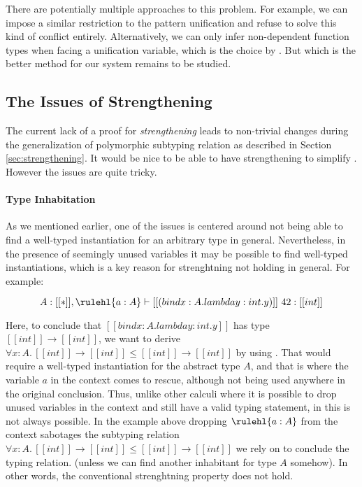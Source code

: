 There are potentially multiple approaches to this problem. For example, we can
impose a similar restriction to the pattern unification and refuse to solve
this kind of conflict entirely. Alternatively, we can only infer non-dependent function types when
facing a unification variable, which is the choice by \citet{dh}. But which is
the better method for our system remains to be studied.

\subsection{The Issues of Strengthening}
\label{sec:habitability}

The current lack of a proof for \emph{strengthening} leads to non-trivial
changes during the generalization of polymorphic subtyping relation as
described in Section \ref{sec:strengthening}. It would be nice to be able to
have strengthening to simplify \name. However the issues are
quite tricky.

\paragraph{Type Inhabitation}
As we mentioned earlier, one of the issues is centered around not being able to find a
well-typed instantiation for an arbitrary type in general. Nevertheless, in the presence of
seemingly unused variables it may be possible to find well-typed instantiations,
which is a key reason for strenghtning not holding in general. For example:

\begin{equation*}
    A : [[*]], \rulehl{a : A} \vdash [[(bind x : A. lambda y : int. y)]]~42 : [[int]]
\end{equation*}

Here, to conclude that $[[bind x : A. lambda y : int. y]]$ has type $[[int]] \rightarrow [[int]]$,
we want to derive $\forall x : A.\, [[int]] \rightarrow [[int]] \le [[int]] \rightarrow [[int]]$ by
using . That would require a well-typed instantiation
for the abstract type $A$, and that is where the variable $a$ in the context
comes to rescue, although not being used anywhere in the original conclusion.
Thus, unlike other calculi where it is possible to drop unused variables in the context
and still have a valid typing statement, in \name this is not always possible. In the example
above dropping $\rulehl{a : A}$ from the context sabotages the subtyping relation
$\forall x : A.\, [[int]] \rightarrow [[int]] \le [[int]] \rightarrow [[int]]$
we rely on to conclude the typing relation.
(unless we can find another inhabitant for type $A$ somehow).
In other words, the conventional strenghtning property does not hold.

